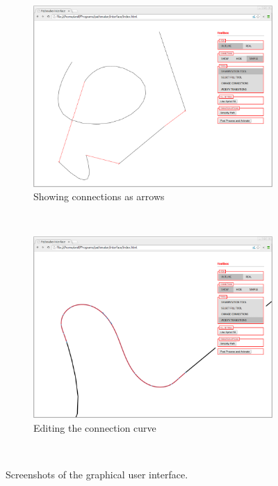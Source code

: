 \begin{figure}
\begin{subfigure}[t]{0.45\textwidth}
\includegraphics[width=\textwidth]{images/ui/i3.png}
\caption{Showing connections as arrows}\label{fig:simple_conn}
\end{subfigure}~
\begin{subfigure}[t]{0.45\textwidth}
\includegraphics[width=\textwidth]{images/ui/i4.png}
\caption{Editing the connection curve}
\end{subfigure}~
\caption{Screenshots of the graphical user interface.}\label{screenshots}
\end{figure}


